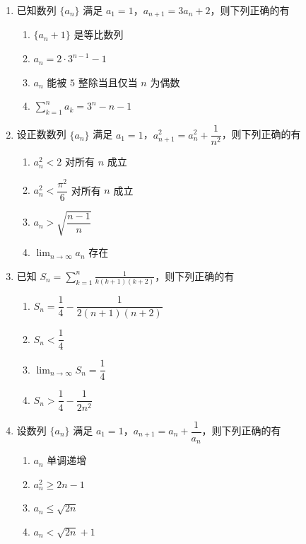 \documentclass[12pt, a4paper]{ctexart}
\newcommand{\score}[1]{\hfill\makebox[2cm][l]{(#1分)}}
\begin{document}
\vspace{0.3cm}

\begin{enumerate}[resume]
\item 已知数列 $\{a_n\}$ 满足 $a_1 = 1$，$a_{n+1} = 3a_n + 2$，则下列正确的有\score{5}
\begin{enumerate}[label=\Alph*.]
\item $\{a_n + 1\}$ 是等比数列
\item $a_n = 2 \cdot 3^{n-1} - 1$
\item $a_n$ 能被 $5$ 整除当且仅当 $n$ 为偶数
\item $\displaystyle\sum_{k=1}^{n} a_k = 3^n - n - 1$
\end{enumerate}

\item 设正数数列 $\{a_n\}$ 满足 $a_1 = 1$，$a_{n+1}^2 = a_n^2 + \dfrac{1}{n^2}$，则下列正确的有\score{5}
\begin{enumerate}[label=\Alph*.]
\item $a_n^2 < 2$ 对所有 $n$ 成立
\item $a_n^2 < \dfrac{\pi^2}{6}$ 对所有 $n$ 成立
\item $a_n > \sqrt{\dfrac{n-1}{n}}$
\item $\displaystyle\lim_{n \to \infty} a_n$ 存在
\end{enumerate}

\item 已知 $S_n = \displaystyle\sum_{k=1}^{n} \frac{1}{k(k+1)(k+2)}$，则下列正确的有\score{5}
\begin{enumerate}[label=\Alph*.]
\item $S_n = \dfrac{1}{4} - \dfrac{1}{2(n+1)(n+2)}$
\item $S_n < \dfrac{1}{4}$
\item $\displaystyle\lim_{n \to \infty} S_n = \dfrac{1}{4}$
\item $S_n > \dfrac{1}{4} - \dfrac{1}{2n^2}$
\end{enumerate}

\item 设数列 $\{a_n\}$ 满足 $a_1 = 1$，$a_{n+1} = a_n + \dfrac{1}{a_n}$，则下列正确的有\score{5}
\begin{enumerate}[label=\Alph*.]
\item $a_n$ 单调递增
\item $a_n^2 \geqslant 2n - 1$
\item $a_n \leqslant \sqrt{2n}$
\item $a_n < \sqrt{2n} + 1$
\end{enumerate}

\end{enumerate}
\end{document}
